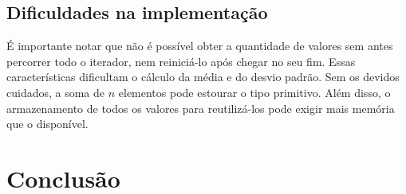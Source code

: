 \documentclass[brazil, a4paper,12pt]{article}
\begin{document}
\subsection {Dificuldades na implementação}

É importante notar que não é possível obter a quantidade de valores sem antes percorrer todo o iterador, nem reiniciá-lo após chegar no seu fim. Essas características dificultam o cálculo da média e do desvio padrão. Sem os devidos cuidados, a soma de $n$ elementos pode estourar o tipo primitivo. Além disso, o armazenamento de todos os valores para reutilizá-los pode exigir mais memória que o disponível.

\section {Conclusão}
\end{document}
